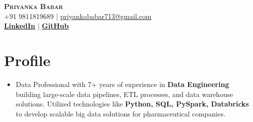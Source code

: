 \documentclass[letterpaper,11pt]{article}
\begin{document}

\begin{center}
    \textbf{\Huge \scshape Priyanka Babar} \\ \vspace{1pt}
    \small +91 9811819689 $|$ \href{mailto:priyankababar713@gmail.com}{{priyankababar713@gmail.com}}    \\ 
    \small  
    \href{https://www.linkedin.com/in/priyanka-babar-352a70181/}{\bf LinkedIn} $|$
    \href{https://github.com/babar24}{\bf GitHub} 
    
\end{center}


\section{Profile}
\begin{itemize}[leftmargin=0.15in, label={}]
\item 
Data Professional with 7+ years of experience in \textbf{Data Engineering} building large-scale data pipelines, ETL processes, and data warehouse solutions. Utilized technologies like \textbf{Python, SQL, PySpark, Databricks} to develop scalable big data solutions for pharmaceutical companies.
\end{itemize}

\end{document}
